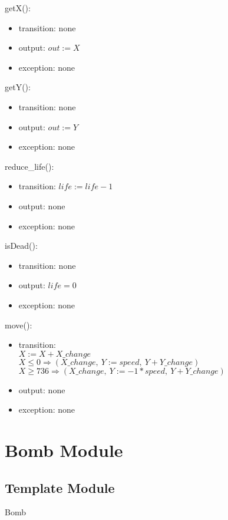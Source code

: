\documentclass[12pt]{article}
\begin{document}
\noindent getX():
\begin{itemize}
\item transition: none
\item output: $out := X$
\item exception: none
\end{itemize}

\noindent getY():
\begin{itemize}
\item transition: none
\item output: $out := Y$
\item exception: none
\end{itemize}

\noindent reduce\_life():
\begin{itemize}
\item transition: $life := life - 1$
\item output: none
\item exception: none
\end{itemize}

\noindent isDead():
\begin{itemize}
\item transition: none
\item output: $life = 0$
\item exception: none
\end{itemize}

\noindent move():
\begin{itemize}
\item transition: \\
$X := X + X\_change$\\
$X \leq 0 \Rightarrow (X\_change,\ Y  := speed,\ Y + Y\_change)$\\
$X \geq 736 \Rightarrow (X\_change,\ Y  := -1*speed,\ Y + Y\_change)$
\item output: none
\item exception: none
\end{itemize}
\newpage

\section{Bomb Module}

\subsection*{Template Module}
Bomb
\end{document}
